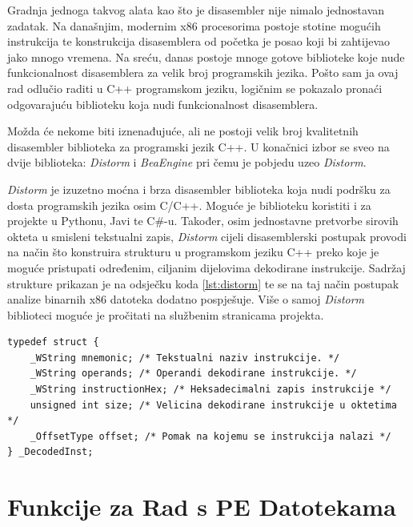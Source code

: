 \documentclass[times, utf8, diplomski, numeric]{fer}
\begin{document}
Gradnja jednoga takvog alata kao što je disasembler nije nimalo
jednostavan zadatak. Na današnjim, modernim x86 procesorima
postoje stotine mogućih instrukcija te konstrukcija disasemblera
od početka je posao koji bi zahtijevao jako mnogo vremena. Na
sreću, danas postoje mnoge gotove biblioteke koje nude
funkcionalnost disasemblera za velik broj programskih jezika.
Pošto sam ja ovaj rad odlučio raditi u C++ programskom jeziku,
logičnim se pokazalo pronaći odgovarajuću biblioteku koja nudi
funkcionalnost disasemblera.

Možda će nekome biti iznenađujuće, ali ne postoji velik broj
kvalitetnih disasembler biblioteka za programski jezik C++. U
konačnici izbor se sveo na dvije biblioteka:
\emph{Distorm}\citep{distorm} i
\emph{BeaEngine}\citep{bea_engine} pri čemu je pobjedu uzeo
\emph{Distorm}.

\emph{Distorm} je izuzetno moćna i brza disasembler biblioteka
koja nudi podršku za dosta programskih jezika osim C/C++. Moguće
je biblioteku koristiti i za projekte u Pythonu, Javi te C\#-u.
Također, osim jednostavne pretvorbe sirovih okteta u smisleni
tekstualni zapis, \emph{Distorm} cijeli disasemblerski postupak
provodi na način što konstruira strukturu u programskom jeziku
C++ preko koje je moguće pristupati određenim, ciljanim
dijelovima dekodirane instrukcije. Sadržaj strukture prikazan je
na odsječku koda \ref{lst:distorm} te se na taj način postupak
analize binarnih x86 datoteka dodatno pospješuje. Više o samoj
\emph{Distorm} biblioteci moguće je pročitati na službenim
stranicama projekta\citep{distorm}. 

\pagebreak
\begin{lstlisting}[frame=single, caption=Temeljna \emph{distorm} struktura za dekodiranu instrukciju, label={lst:distorm}]
typedef struct {
	_WString mnemonic; /* Tekstualni naziv instrukcije. */
	_WString operands; /* Operandi dekodirane instrukcije. */
	_WString instructionHex; /* Heksadecimalni zapis instrukcije */
	unsigned int size; /* Velicina dekodirane instrukcije u oktetima */
	_OffsetType offset; /* Pomak na kojemu se instrukcija nalazi */
} _DecodedInst;
\end{lstlisting}

\section{Funkcije za Rad s PE Datotekama}
\end{document}
